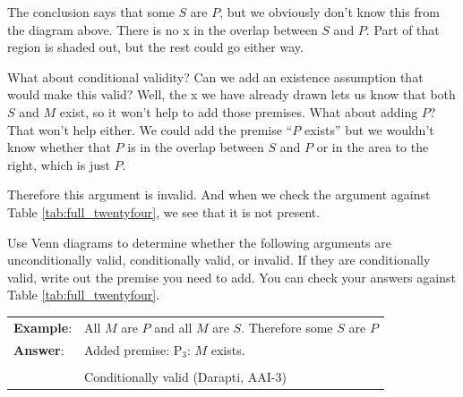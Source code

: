 The conclusion says that some $S$ are $P$, but we obviously don't know this from the diagram above. There is no x in the overlap between $S$ and $P$. Part of that region is shaded out, but the rest could go either way.

What about conditional validity? Can we add an existence assumption that would make this valid? Well, the x we have already drawn lets us know that both $S$ and $M$ exist, so it won't help to add those premises. What about adding $P$? That won't help either. We could add the premise ``$P$ exists'' but we wouldn't know whether that $P$ is in the overlap between $S$ and $P$ or in the area to the right, which is just $P$. \label{CVFex3}

Therefore this argument is invalid. And when we check the argument against Table \ref{tab:full_twentyfour}, we see that it is not present. 

\practiceproblems
\noindent \problempart Use Venn diagrams to determine whether the following arguments are unconditionally valid, conditionally valid, or invalid. If they are conditionally valid, write out the premise you need to add. You can check your answers against Table \ref{tab:full_twentyfour}.

\begin{longtabu}{p{.1\linewidth}p{.9\linewidth}} 
\textbf{Example}: & All $M$ are $P$ and all $M$ are $S$. Therefore some $S$ are $P$ \\
\textbf{Answer}: & Added premise: P$_3$: $M$ exists. \\
& \begin{center}
\end{center}
\\ &
Conditionally valid (Darapti, AAI-3)
\end{longtabu} 

